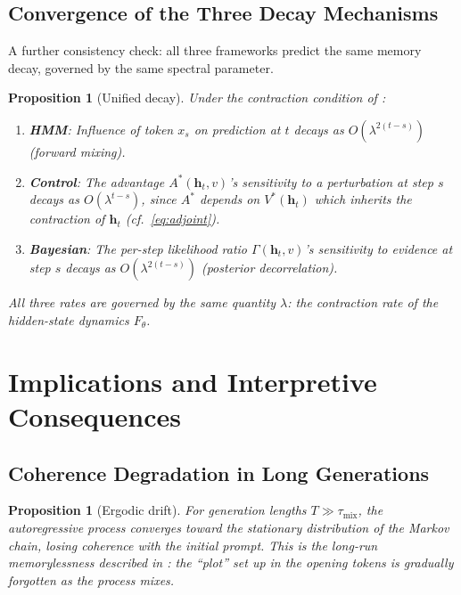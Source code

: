 \documentclass[11pt,a4paper]{article}
\theoremstyle{plain}
\newtheorem{proposition}[theorem]{Proposition}
\theoremstyle{definition}
\theoremstyle{remark}
\begin{document}
\subsection{Convergence of the Three Decay Mechanisms}

A further consistency check: all three frameworks predict the same memory
decay, governed by the same spectral parameter.

\begin{proposition}[Unified decay]\label{prop:unified_decay}
Under the contraction condition of :
\begin{enumerate}[label=(\alph*),nosep]
  \item \textbf{HMM}: Influence of token $x_s$ on prediction at $t$ decays as
        $O(\lambda^{2(t-s)})$ (forward mixing).
  \item \textbf{Control}: The advantage $A^*(\bm{h}_t, v)$'s sensitivity to a
        perturbation at step $s$ decays as $O(\lambda^{t-s})$, since
        $A^*$ depends on $V^*(\bm{h}_t)$ which inherits the contraction of
        $\bm{h}_t$ (cf.~\eqref{eq:adjoint}).
  \item \textbf{Bayesian}: The per-step likelihood ratio $\Gamma(\bm{h}_t, v)$'s
        sensitivity to evidence at step $s$ decays as $O(\lambda^{2(t-s)})$
        (posterior decorrelation).
\end{enumerate}
All three rates are governed by the same quantity $\lambda$: the contraction
rate of the hidden-state dynamics $F_\theta$.
\end{proposition}


\section{Implications and Interpretive Consequences}\label{sec:implications}

\subsection{Coherence Degradation in Long Generations}

\begin{proposition}[Ergodic drift]
For generation lengths $T \gg \tau_{\mathrm{mix}}$, the autoregressive process
converges toward the stationary distribution of the Markov chain, losing
coherence with the initial prompt. This is the long-run memorylessness described
in : the ``plot'' set up in the opening tokens is
gradually forgotten as the process mixes.
\end{proposition}
\end{document}
